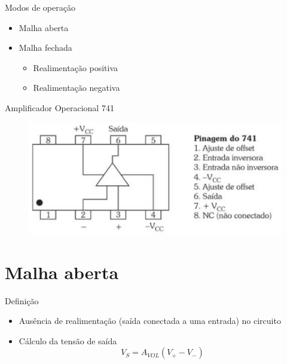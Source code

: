 \documentclass[aspectratio=169,
				xcolor=table]{beamer}
\begin{document}
	\begin{frame}{Modos de operação}
		\begin{itemize}
			\item Malha aberta
			\vspace{1em}
			\item Malha fechada
			\begin{itemize}
				\item Realimentação positiva
				\item Realimentação negativa
			\end{itemize}
		\end{itemize}
	\end{frame}
	
	\begin{frame}{Amplificador Operacional 741}
		\begin{figure}[hbtp]
		\centering
		\includegraphics[height=.7\textheight, keepaspectratio]{../figs/cap02/ao741}
		\end{figure}		
	\end{frame}
	
	\section{Malha aberta}
	\begin{frame}{Definição}
		\begin{itemize}
			\item Ausência de realimentação (saída conectada a uma entrada) no circuito 
			\vspace{1em}
			\item Cálculo da tensão de saída
			\begin{equation*}
				V_S = A_{VOL}(V_{+}-V_{-})
			\end{equation*}
		\end{itemize}
	\end{frame}
	
\end{document}
